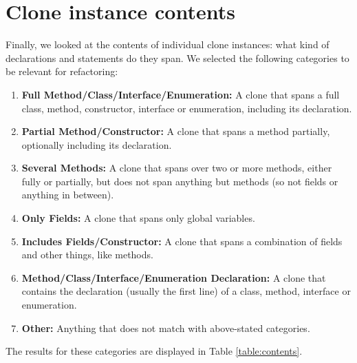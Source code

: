 \section{Clone instance contents}\label{chap:clonecontents}
Finally, we looked at the contents of individual clone instances: what kind of declarations and statements do they span. We selected the following categories to be relevant for refactoring:
\begin{enumerate}
  \item \textbf{Full Method/Class/Interface/Enumeration:} A clone that spans a full class, method, constructor, interface or enumeration, including its declaration.
  \item \textbf{Partial Method/Constructor:} A clone that spans a method partially, optionally including its declaration.
  \item \textbf{Several Methods:} A clone that spans over two or more methods, either fully or partially, but does not span anything but methods (so not fields or anything in between).
  \item \textbf{Only Fields:} A clone that spans only global variables.
  \item \textbf{Includes Fields/Constructor:} A clone that spans a combination of fields and other things, like methods.
  \item \textbf{Method/Class/Interface/Enumeration Declaration:} A clone that contains the declaration (usually the first line) of a class, method, interface or enumeration.
  \item \textbf{Other:} Anything that does not match with above-stated categories.
\end{enumerate}

The results for these categories are displayed in Table \ref{table:contents}.

